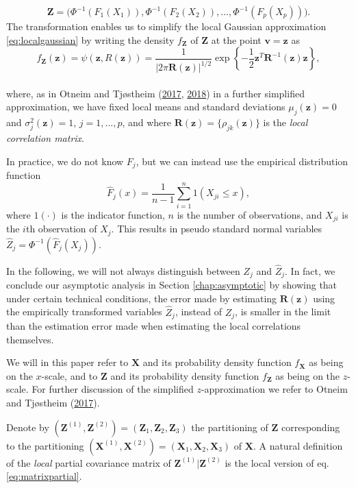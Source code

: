 \documentclass[
  12pt,
  letterpaper]{article}
\newcommand{\X}{\bm{X}}
\newcommand{\Xone}{\bm{X}^{(1)}}
\newcommand{\Xtwo}{\bm{X}^{(2)}}
\newcommand{\Z}{\bm{Z}}
\newcommand{\z}{\bm{z}}
\newcommand{\Zone}{\bm{Z}^{(1)}}
\newcommand{\Ztwo}{\bm{Z}^{(2)}}
\newcommand{\fv}{\bm{v}}
\newcommand{\R}{\bm{R}}
\theoremstyle{definition}
\theoremstyle{definition}
\theoremstyle{definition}
\theoremstyle{remark}
\begin{document}
\begin{equation}
\Z = \Big(\Phi^{-1}\left(F_{1}(X_1)\right), \Phi^{-1}\left(F_{2}(X_2)\right), \ldots, \Phi^{-1}\left(F_{p}(X_p)\right)\Big).
\label{eq:trans}
\end{equation}
The transformation enables us to simplify the local Gaussian approximation \eqref{eq:localgaussian} by writing the density \(f_{\Z}\) of \(\Z\) at the point \(\fv = \z\) as
\begin{equation}
f_{\Z}(\z) = \psi(\z, R(\z)) = \frac{1}{|2\pi\R(\z)|^{1/2}}\exp\left\{-\frac{1}{2}\z^T\R^{-1}(\z)\z\right\},
\label{eq:lgdeapprox}
\end{equation}\\
where, as in Otneim and Tjøstheim (\protect\hyperlink{ref-otneim2017locally}{2017}, \protect\hyperlink{ref-otneim2017conditional}{2018}) in a further simplified approximation, we have fixed local means and standard deviations \(\mu_j(\z) = 0\) and \(\sigma_j^2(\z) = 1\), \(j = 1,\ldots,p\), and where \(\R(\z) = \{\rho_{jk}(\z)\}\) is the \emph{local correlation matrix}.

In practice, we do not know \(F_{j}\), but we can instead use the empirical distribution function
\[\widehat F_{j}(x) = \frac{1}{n-1}\sum_{i=1}^n 1\left(X_{ji} \leq x\right),\]
where \(1(\cdot)\) is the indicator function, \(n\) is the number of observations, and \(X_{ji}\) is the \(i\)th observation of \(X_j\). This results in pseudo standard normal variables \(\widehat Z_{j} = \Phi^{-1}(\widehat F_{j}(X_j))\).

In the following, we will not always distinguish between \(Z_j\) and \(\widehat Z_{j}\). In fact, we conclude our asymptotic analysis in Section \ref{chap:asymptotic} by showing that under certain technical conditions, the error made by estimating \(\R(\z)\) using the empirically transformed variables \(\widehat Z_{j}\), instead of \(Z_j\), is smaller in the limit than the estimation error made when estimating the local correlations themselves.

We will in this paper refer to \(\X\) and its probability density function \(f_{\X}\) as being on the \(x\)-scale, and to \(\Z\) and its probability density function \(f_{\Z}\) as being on the \(z\)-scale. For further discussion of the simplified \(z\)-approximation we refer to Otneim and Tjøstheim (\protect\hyperlink{ref-otneim2017locally}{2017}).

Denote by \((\Zone, \Ztwo) = (\Z_1, \Z_2, \Z_3)\) the partitioning of \(\Z\) corresponding to the partitioning \((\Xone, \Xtwo) = (\X_1, \X_2, \X_3)\) of \(\X\). A natural definition of the \emph{local} partial covariance matrix of \(\Zone|\Ztwo\) is the local version of eq. \eqref{eq:matrixpartial}.
\end{document}
